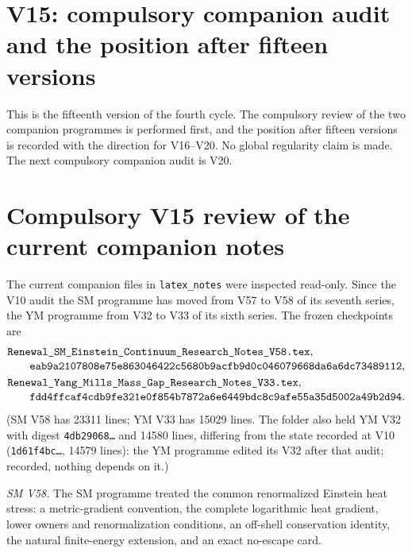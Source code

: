 \documentclass[11pt]{article}
\theoremstyle{plain}
\theoremstyle{definition}
\theoremstyle{remark}
\begin{document}
\section{V15: compulsory companion audit and the position after fifteen versions}
\label{sec:c4v15-entry}

This is the fifteenth version of the fourth cycle.  The compulsory
review of the two companion programmes is performed first, and the
position after fifteen versions is recorded with the direction for
V16--V20.  No global regularity claim is made.  The next compulsory
companion audit is V20.

\section{Compulsory V15 review of the current companion notes}
\label{sec:c4v15-companion-audit}

The current companion files in \texttt{latex\_notes} were inspected
read-only.  Since the V10 audit the SM programme has moved from V57
to V58 of its seventh series, the YM programme from V32 to V33 of its
sixth series.  The frozen checkpoints are
\begin{align}
 &\texttt{Renewal\_SM\_Einstein\_Continuum\_Research\_Notes\_V58.tex},
 \notag\\[-2pt]
 &\qquad
 \texttt{eab9a2107808e75e863046422c5680b9acfb9d0c046079668da6a6dc73489112},
 \label{eq:c4v15-SM-checkpoint}\\
 &\texttt{Renewal\_Yang\_Mills\_Mass\_Gap\_Research\_Notes\_V33.tex},
 \notag\\[-2pt]
 &\qquad
 \texttt{fdd4ffcaf4cdb9fe321e0f854b7872a6e6449bdc8c9afe55a35d5002a49b2d94}.
 \label{eq:c4v15-YM-checkpoint}
\end{align}
(SM V58 has 23311 lines; YM V33 has 15029 lines.  The folder also
held YM V32 with digest \texttt{4db29068\dots} and 14580 lines, differing from
the state recorded at V10 (\texttt{1d61f4bc\dots}, 14579 lines): the YM programme
edited its V32 after that audit; recorded, nothing depends on it.)

\emph{SM V58.}  The SM programme treated the common renormalized
Einstein heat stress: a metric-gradient convention, the complete
logarithmic heat gradient, lower owners and renormalization
conditions, an off-shell conservation identity, the natural
finite-energy extension, and an exact no-escape card.
\end{document}
